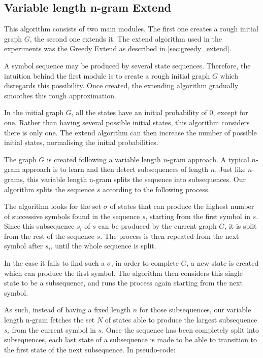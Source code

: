\subsection{Variable length n-gram Extend}
\label{sec:vl-ngram-extend}
This algorithm consists of two main modules. The first one creates a rough initial graph $G$, the second one extends it. The extend algorithm used in the experiments was the Greedy Extend as described in \ref{sec:greedy_extend}.

A symbol sequence may be produced by several state sequences. Therefore, the intuition behind the first module is to create a rough initial graph $G$ which disregards this possibility. Once created, the extending algorithm gradually smoothes this rough approximation.

In the initial graph $G$, all the states have an initial probability of 0, except for one. Rather than having several possible initial states, this algorithm considers there is only one. The extend algorithm can then increase the number of possible initial states, normalising the initial probabilities.

The graph $G$ is created following a variable length $n$-gram approach. A typical $n$-gram approach is to learn and then detect subsequences of length $n$. Just like $n$-grams, this variable length n-gram splits the sequence into subsequences. Our algorithm splits the sequence $s$ according to the following process.

The algorithm looks for the set $\sigma$ of states that can produce the highest number of successive symbols found in the sequence $s$, starting from the first symbol in $s$. Since this subsequence $s_i$ of $s$ can be produced by the current graph $G$, it is split from the rest of the sequence $s$. The process is then repeated from the next symbol after $s_i$, until the whole sequence is split.

In the case it fails to find such a $\sigma$, in order to complete $G$, a new state is created which can produce the first symbol. The algorithm then considers this single state to be a subsequence, and runs the process again starting from the next symbol.

As such, instead of having a fixed length $n$ for those subsequences, our variable length n-gram fetches the set $N$ of states able to produce the largest subsequence $s_i$ from the current symbol in $s$. Once the sequence has been completely split into subsequences, each last state of a subsequence is made to be able to transition to the first state of the next subsequence. In pseudo-code:

